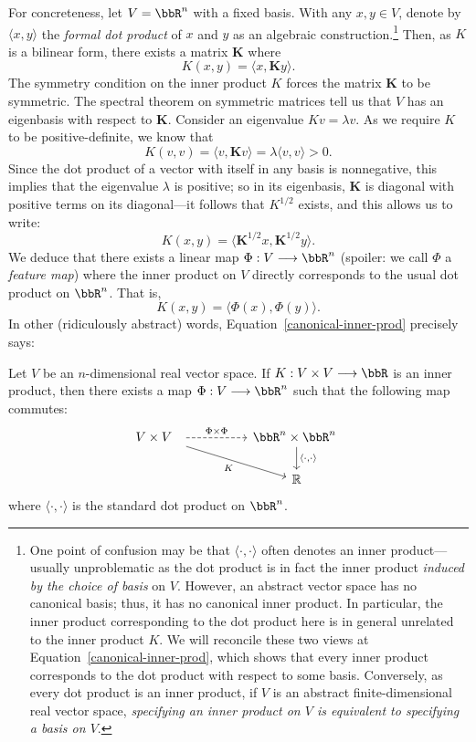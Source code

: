 \documentclass[twoside,11pt]{homework}
\renewcommand{\to}{\longrightarrow}
\begin{document}
For concreteness, let $V = \bbR^n$ with a fixed basis. With any $x,y \in V$, denote by $\langle x,y\rangle$ the \emph{formal dot product} of $x$ and $y$ as an algebraic construction.\footnote{One point of confusion may be that $\langle \cdot,\cdot \rangle$ often denotes an inner product---usually unproblematic as the dot product is in fact the inner product \emph{induced by the choice of basis} on $V$. However, an abstract vector space has no canonical basis; thus, it has no canonical inner product. In particular, the inner product corresponding to the dot product here is in general unrelated to the inner product $K$. We will reconcile these two views at Equation~\ref{canonical-inner-prod}, which shows that every inner product corresponds to the dot product with respect to some basis. Conversely, as every dot product is an inner product, if $V$ is an abstract finite-dimensional real vector space, \emph{specifying an inner product on $V$ is equivalent to specifying a basis on $V$}.} Then, as $K$ is a bilinear form, there exists a matrix $\mathbf{K}$ where
\begin{equation}\label{kernel-history}
  K(x,y) = \langle x, \mathbf{K}y\rangle.
\end{equation}
The symmetry condition on the inner product $K$ forces the matrix $\mathbf{K}$ to be symmetric. The spectral theorem on symmetric matrices tell us that $V$ has an eigenbasis with respect to $\mathbf{K}$. Consider an eigenvalue $K v = \lambda v$. As we require $K$ to be positive-definite, we know that
\[K(v,v) = \langle v, \mathbf{K}v\rangle = \lambda \langle v,v\rangle> 0.\]
Since the dot product of a vector with itself in any basis is nonnegative, this implies that the eigenvalue $\lambda$ is positive; so in its eigenbasis, $\mathbf{K}$ is diagonal with positive terms on its diagonal---it follows that $K^{1/2}$ exists, and this allows us to write:
\[K(x,y) = \langle \mathbf{K}^{1/2} x, \mathbf{K}^{1/2}y\rangle.\]
We deduce that there exists a linear map $\Phi: V \to \bbR^n$ (spoiler: we call $\Phi$ a \emph{feature map}) where the inner product on $V$ directly corresponds to the usual dot product on $\bbR^n$. That is,
\begin{equation}\label{canonical-inner-prod}
  K(x,y) = \langle \Phi(x), \Phi(y)\rangle.
\end{equation}
In other (ridiculously abstract) words, Equation~\ref{canonical-inner-prod} precisely says:
\begin{proposition}\label{finite-IP}
  Let $V$ be an $n$-dimensional real vector space. If $K : V \times V \to \bbR$ is an inner product, then there exists a map $\Phi: V \to \bbR^n$ such that the following map commutes:
  \[\begin{tikzcd}
V \times V\ \  \arrow[dashed, rr, "\Phi \times \Phi"] \arrow[drr, "K"'] & & \bbR^n \times \bbR^n \ \arrow[d, "{\langle\cdot,\cdot \rangle}"] \\
& & \mathbb{R}
\end{tikzcd}
\]
  where $\langle \cdot, \cdot \rangle$ is the standard dot product on $\bbR^n$.
\end{proposition}
\end{document}
